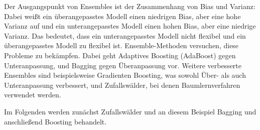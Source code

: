 	Der Ausgangspunkt von Ensembles ist der Zusammenhang von Bias und Varianz: Dabei weißt ein überangepasstes Modell einen niedrigen Bias, aber eine hohe Varianz auf und ein unterangepasstes Modell einen hohen Bias, aber eine niedrige Varianz. Das bedeutet, dass ein unterangepasstes Modell nicht flexibel und ein überangepasstes Modell zu flexibel ist. Ensemble-Methoden versuchen, diese Probleme zu bekämpfen. Dabei geht Adaptives Boosting (AdaBoost) gegen Unteranpassung, und Bagging gegen Überanpassung vor. Weitere verbesserte Ensembles sind beispielsweise Gradienten Boosting, was sowohl Über- als auch Unteranpassung verbessert, und Zufallswälder, bei denen Baumlernverfahren verwendet werden.

	Im Folgenden werden zunächst Zufallswälder und an diesem Beispiel Bagging und anschließend Boosting behandelt.

